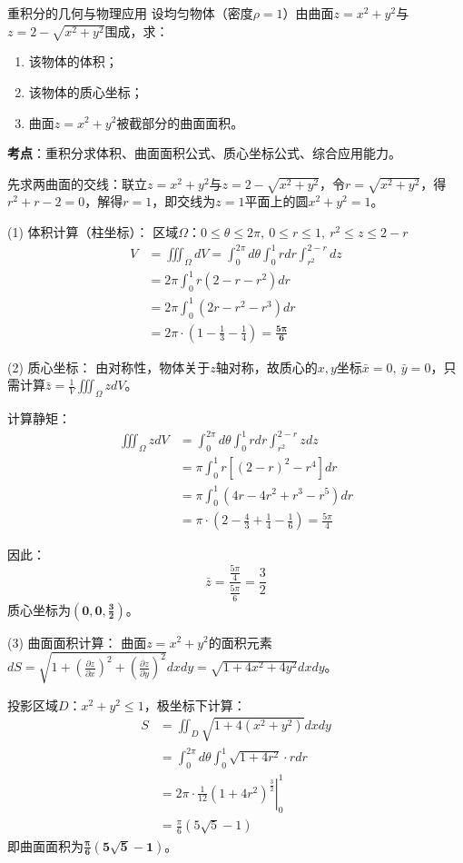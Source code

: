 \documentclass[UTF8,zihao=-4,openany]{ctexbook}
\begin{document}
\begin{example}{重积分的几何与物理应用}
设均匀物体（密度$\rho=1$）由曲面$z=x^2+y^2$与$z=2-\sqrt{x^2+y^2}$围成，求：
\begin{enumerate}
  \item 该物体的体积；
  \item 该物体的质心坐标；
  \item 曲面$z=x^2+y^2$被截部分的曲面面积。
\end{enumerate}
\tcblower
\smallskip
\noindent \textbf{考点}：重积分求体积、曲面面积公式、质心坐标公式、综合应用能力。

先求两曲面的交线：联立$z=x^2+y^2$与$z=2-\sqrt{x^2+y^2}$，令$r=\sqrt{x^2+y^2}$，得$r^2 + r - 2 = 0$，解得$r=1$，即交线为$z=1$平面上的圆$x^2+y^2=1$。

\medskip
(1) 体积计算（柱坐标）：
区域$\Omega$：$0\leq \theta\leq 2\pi,\ 0\leq r\leq 1,\ r^2\leq z\leq 2-r$
$$
\begin{aligned}
V &= \iiint_\Omega dV = \int_{0}^{2\pi} d\theta \int_{0}^{1} r dr \int_{r^2}^{2-r} dz \\
&= 2\pi \int_{0}^{1} r(2-r-r^2) dr \\
&= 2\pi \int_{0}^{1} (2r - r^2 - r^3) dr \\
&= 2\pi \cdot \left( 1 - \frac{1}{3} - \frac{1}{4} \right) = \boldsymbol{\frac{5\pi}{6}}
\end{aligned}
$$

\medskip
(2) 质心坐标：
由对称性，物体关于$z$轴对称，故质心的$x,y$坐标$\bar{x}=0,\ \bar{y}=0$，只需计算$\bar{z} = \frac{1}{V} \iiint_\Omega z dV$。

计算静矩：
$$
\begin{aligned}
\iiint_\Omega z dV &= \int_{0}^{2\pi} d\theta \int_{0}^{1} r dr \int_{r^2}^{2-r} z dz \\
&= \pi \int_{0}^{1} r\left[ (2-r)^2 - r^4 \right] dr \\
&= \pi \int_{0}^{1} (4r - 4r^2 + r^3 - r^5) dr \\
&= \pi \cdot \left( 2 - \frac{4}{3} + \frac{1}{4} - \frac{1}{6} \right) = \frac{5\pi}{4}
\end{aligned}
$$

因此：
$$
\bar{z} = \frac{\frac{5\pi}{4}}{\frac{5\pi}{6}} = \frac{3}{2}
$$
质心坐标为$\boldsymbol{\left( 0, 0, \frac{3}{2} \right)}$。

\medskip
(3) 曲面面积计算：
曲面$z=x^2+y^2$的面积元素$dS = \sqrt{1+\left( \frac{\partial z}{\partial x} \right)^2 + \left( \frac{\partial z}{\partial y} \right)^2} dxdy = \sqrt{1+4x^2+4y^2} dxdy$。

投影区域$D$：$x^2+y^2 \leq 1$，极坐标下计算：
$$
\begin{aligned}
S &= \iint_D \sqrt{1+4(x^2+y^2)} dxdy \\
&= \int_{0}^{2\pi} d\theta \int_{0}^{1} \sqrt{1+4r^2} \cdot r dr \\
&= 2\pi \cdot \frac{1}{12} \left. (1+4r^2)^{\frac{3}{2}} \right|_{0}^{1} \\
&= \frac{\pi}{6} \left( 5\sqrt{5} - 1 \right)
\end{aligned}
$$
即曲面面积为$\boldsymbol{\frac{\pi}{6}\left( 5\sqrt{5} - 1 \right)}$。
\end{example}
\end{document}
